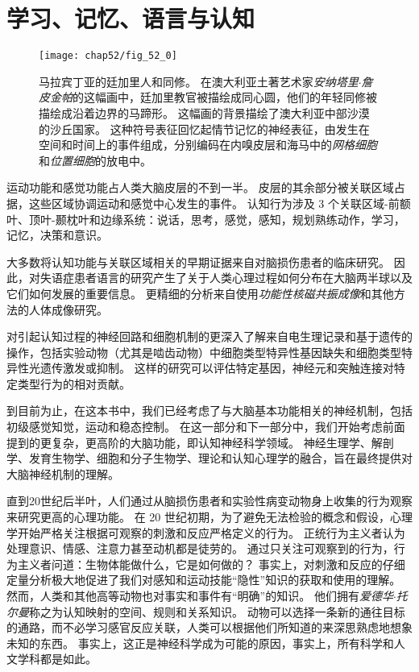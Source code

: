 \part{学习、记忆、语言与认知}


\begin{figure}[htbp]
	\centering
	\texttt{[image: chap52/fig\_52\_0]}
	\caption{马拉宾丁亚的廷加里人和同修。
		在澳大利亚土著艺术家\textit{安纳塔里$\cdot$詹皮金帕}的这幅画中，廷加里教官被描绘成同心圆，他们的年轻同修被描绘成沿着边界的马蹄形。
		这幅画的背景描绘了澳大利亚中部沙漠的沙丘国家。
		这种符号表征回忆起情节记忆的神经表征，由发生在空间和时间上的事件组成，分别编码在内嗅皮层和海马中的\textit{网格细胞}和\textit{位置细胞}的放电中。}
	\label{fig:52_0}
\end{figure}


运动功能和感觉功能占人类大脑皮层的不到一半。
皮层的其余部分被关联区域占据，这些区域协调运动和感觉中心发生的事件。
认知行为涉及 3 个关联区域-前额叶、顶叶-颞枕叶和边缘系统：说话，思考，感觉，感知，规划熟练动作，学习，记忆，决策和意识。


大多数将认知功能与关联区域相关的早期证据来自对脑损伤患者的临床研究。
因此，对失语症患者语言的研究产生了关于人类心理过程如何分布在大脑两半球以及它们如何发展的重要信息。
更精细的分析来自使用\textit{功能性核磁共振成像}和其他方法的人体成像研究。


对引起认知过程的神经回路和细胞机制的更深入了解来自电生理记录和基于遗传的操作，包括实验动物（尤其是啮齿动物）中细胞类型特异性基因缺失和细胞类型特异性光遗传激发或抑制。
这样的研究可以评估特定基因，神经元和突触连接对特定类型行为的相对贡献。


到目前为止，在这本书中，我们已经考虑了与大脑基本功能相关的神经机制，包括初级感觉知觉，运动和稳态控制。
在这一部分和下一部分中，我们开始考虑前面提到的更复杂，更高阶的大脑功能，即认知神经科学领域。
神经生理学、解剖学、发育生物学、细胞和分子生物学、理论和认知心理学的融合，旨在最终提供对大脑神经机制的理解。


直到20世纪后半叶，人们通过从脑损伤患者和实验性病变动物身上收集的行为观察来研究更高的心理功能。
在 20 世纪初期，为了避免无法检验的概念和假设，心理学开始严格关注根据可观察的刺激和反应严格定义的行为。
正统行为主义者认为处理意识、情感、注意力甚至动机都是徒劳的。
通过只关注可观察到的行为，行为主义者问道：生物体能做什么，它是如何做的？
事实上，对刺激和反应的仔细定量分析极大地促进了我们对感知和运动技能“隐性”知识的获取和使用的理解。
然而，人类和其他高等动物也对事实和事件有“明确”的知识。
他们拥有\textit{爱德华$\cdot$托尔曼}称之为认知映射的空间、规则和关系知识。
动物可以选择一条新的通往目标的通路，而不必学习感官反应关联，人类可以根据他们所知道的来深思熟虑地想象未知的东西。
事实上，这正是神经科学成为可能的原因，事实上，所有科学和人文学科都是如此。


